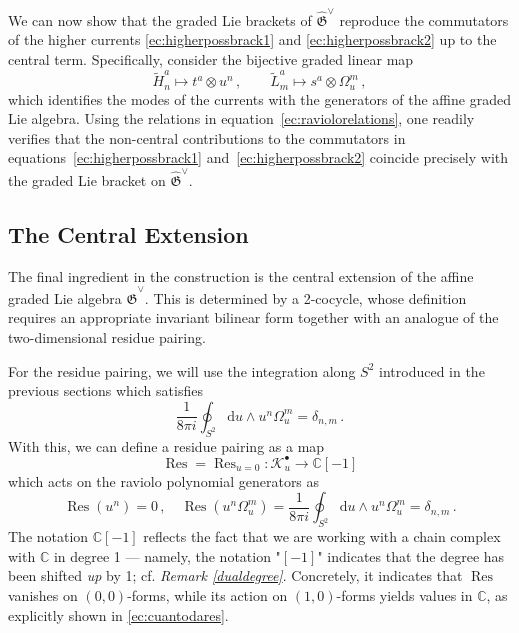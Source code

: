 \documentclass[11pt]{amsart}
\newcommand{\C}{{\mathbb C}}
\newcommand{\tL}{{\tilde L}}
\newcommand{\tH}{{\tilde H}}
\newcommand{\fG}{\mathfrak{G}}
\numberwithin{equation}{section}
\numberwithin{figure}{section}
\numberwithin{table}{section}
\theoremstyle{thm}
\numberwithin{equation}{subsection}
\theoremstyle{definition}
\theoremstyle{rem}
\begin{document}
We can now show that the graded Lie brackets of $
\widehat{\fG}^\vee$ reproduce the commutators of the higher currents \eqref{ec:higherpossbrack1} and \eqref{ec:higherpossbrack2} up to the central term. Specifically, consider the bijective graded linear map
\begin{equation}
\label{ec:modesidentification}
    \tH_n^a \mapsto t^a \otimes u^n \,, \qquad \tL_m^a \mapsto s^a \otimes \Omega^m_u \,,
\end{equation}
which identifies the modes of the currents with the generators of the affine graded Lie algebra. Using the relations in equation~\eqref{ec:raviolorelations}, one readily verifies that the non-central contributions to the commutators in equations~\eqref{ec:higherpossbrack1} and~\eqref{ec:higherpossbrack2} coincide precisely with the graded Lie bracket on $\widehat{\mathfrak{G}}^\vee$. 




\subsection{The Central Extension}

The final ingredient in the construction is the central extension of the affine graded Lie algebra $\widehat{\fG}^\vee$. This is determined by a
2-cocycle, whose definition requires an appropriate invariant bilinear form together with an analogue of the two-dimensional residue pairing.

For the residue pairing, we will use the integration along $S^2$ introduced in the previous sections which satisfies
\begin{equation}
\label{ec:res3}
    \frac{1}{8\pi i} \oint_{S^2} \mathrm{d}u \wedge u^n \Omega^m_u = \delta_{n,m}\,. 
\end{equation}
With this, we can define a residue pairing as a map 
\[
\operatorname{Res} =\operatorname{Res}_{u=0} : \mathcal{K}_u^\bullet \to \mathbb{C}[-1]
\]
which acts on the raviolo polynomial generators as
\begin{equation}
\label{ec:cuantodares}
    \operatorname{Res}(u^n) = 0\,, \quad \operatorname{Res}(u^n\Omega_u^m) = \frac{1}{8\pi i}\oint_{S^2}\mathrm{d}u\wedge u^n\Omega^m_u = \delta_{n,m}\,.
\end{equation}
The notation $\C[-1]$ reflects the fact that we are working with a chain complex with $\C$ in degree 1 --- namely, the notation "$[-1]$" indicates that the degree has been shifted \textit{up} by 1; cf. \textit{Remark \ref{dualdegree}}. Concretely, it indicates that $\operatorname{Res}$ vanishes on $(0,0)$-forms, while its action on $(1,0)$-forms yields values in $\C$, as explicitly shown in \eqref{ec:cuantodares}. 
\end{document}
